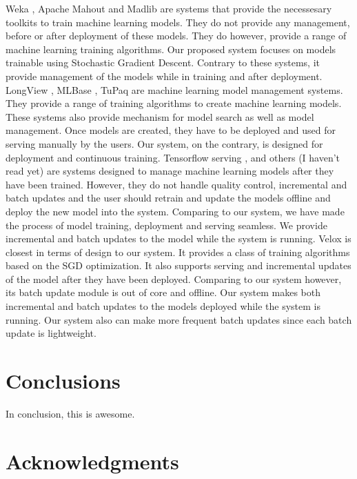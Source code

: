\documentclass{sig-alternate-05-2015}
\begin{document}
Weka \cite{hall2009weka}, Apache Mahout \cite{Owen:2011:MA:2132656} and Madlib \cite{hellerstein2012madlib} are systems that provide the necessesary toolkits to train machine learning models. 
They do not provide any management, before or after deployment of these models. 
They do however, provide a range of machine learning training algorithms. 
Our proposed system focuses on models trainable using Stochastic Gradient Descent. 
Contrary to these systems, it provide management of the models while in training and after deployment.
LongView \cite{akdere2011case}, MLBase \cite{kraska2013mlbase}, TuPaq \cite{sparks2015tupaq} are machine learning model management systems.
They provide a range of training algorithms to create machine learning models.
These systems also provide mechanism for model search as well as model management.
Once models are created, they have to be deployed and used for serving manually by the users.
Our system, on the contrary, is designed for deployment and continuous training.
Tensorflow serving \cite{abadi2016tensorflow}, and others (I haven't read yet) are systems designed to manage machine learning models after they have been trained.
However, they do not handle quality control, incremental and batch updates and the user should retrain and update the models offline and deploy the new model into the system.
Comparing to our system, we have made the process of model training, deployment and serving seamless. 
We provide incremental and batch updates to the model while the system is running.
Velox \cite{crankshaw2014missing} is closest in terms of design to our system.
It provides a class of training algorithms based on the SGD optimization.
It also supports serving and incremental updates of the model after they have been deployed.
Comparing to our system however, its batch update module is out of core and offline.
Our system makes both incremental and batch updates to the models deployed while the system is running.
Our system also can make more frequent batch updates since each batch update is lightweight.

\section{Conclusions} \label{conclusion}
In conclusion, this is awesome. 
\section{Acknowledgments}


\end{document}
